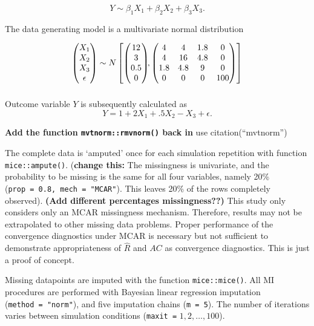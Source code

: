 \documentclass[Royal,times,sageh]{sagej}
\begin{document}
\[Y \sim \beta_1 X_1 + \beta_2 X_2 + \beta_3 X_3.\]

The data generating model is a multivariate normal distribution

\begin{align*}
\begin{pmatrix}X_1\\
X_2\\
X_3\\
\epsilon
\end{pmatrix} \sim  N
\begin{bmatrix}
\begin{pmatrix}
12\\
3\\
0.5\\
0
\end{pmatrix}\!\!,
\begin{pmatrix}
4 & 4 & 1.8 & 0\\
4 & 16 & 4.8 & 0\\
1.8 & 4.8 & 9 & 0\\
0 & 0 & 0 & 100
\end{pmatrix}
\end{bmatrix}\\[2\jot]
\end{align*}

Outcome variable \(Y\) is subsequently calculated as
\[Y =  1 + 2X_1 + .5X_2 - X_3 + \epsilon .\]

\textbf{Add the function \texttt{mvtnorm::rmvnorm()} back in} use
citation(``mvtnorm'')

The complete data is `amputed' once for each simulation repetition with
function \texttt{mice::ampute()}. (\textbf{change this:} The missingness
is univariate, and the probability to be missing is the same for all
four variables, namely 20\% (\texttt{prop\ =\ 0.8,\ mech\ =\ "MCAR"}).
This leaves 20\% of the rows completely observed). \textbf{(Add
different percentages missingness??)} This study only considers only an
MCAR missingness mechanism. Therefore, results may not be extrapolated
to other missing data problems. Proper performance of the convergence
diagnostics under MCAR is necessary but not sufficient to demonstrate
appropriateness of \(\widehat{R}\) and \(AC\) as convergence
diagnostics. This is just a proof of concept.

Missing datapoints are imputed with the function \texttt{mice::mice()}.
All MI procedures are performed with Bayesian linear regression
imputation (\texttt{method\ =\ "norm"}), and five imputation chains
(\texttt{m\ =\ 5}). The number of iterations varies between simulation
conditions (\texttt{maxit\ =} \(1, 2, \dots, 100\)).
\end{document}
